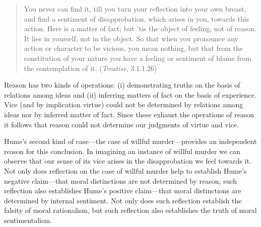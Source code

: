 \begin{quote}
	You never can find it, till you turn your reflection into your own breast, and find a sentiment of disapprobation, which arises in you, towards this action. Here is a matter of fact; but 'tis the object of feeling, not of reason. It lies in yourself, not in the object. So that when you pronounce any action or character to be vicious, you mean nothing, but that from the constitution of your nature you have a feeling or sentiment of blame from the contemplation of it. (\emph{Treatise}, 3.1.1.26)
\end{quote}

Reason has two kinds of operations: (i) demonstrating truths on the basis of relations among ideas and (ii) inferring matters of fact on the basis of experience. Vice (and by implication virtue) could not be determined by relations among ideas nor by inferred matter of fact. Since these exhaust the operations of reason it follows that reason could not determine our judgments of virtue and vice.

Hume's second kind of case---the case of willful murder---provides an independent reason for this conclusion. In imagining an instance of willful murder we can observe that our sense of its vice arises in the disapprobation we feel towards it. Not only does reflection on the case of willful murder help to establish Hume's negative claim---that moral distinctions are not determined by reason, such reflection also establishes Hume's positive claim---that moral distinctions are determined by internal sentiment. Not only does such reflection establish the falsity of moral rationalism, but such reflection also establishes the truth of moral sentimentalism. \change

% 


